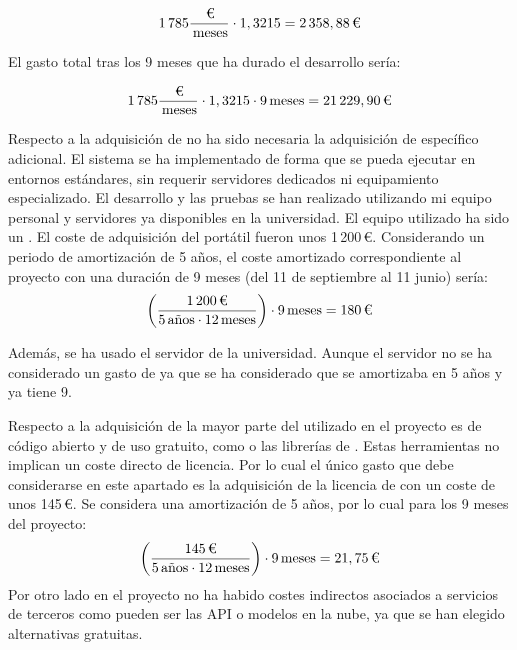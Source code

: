 $$
1\,785\frac{\,\text{\texteuro}}{\,\text{meses}} \cdot 1,3215
= 2\,358,88\,\text{\texteuro}
$$

El gasto total tras los 9 meses que ha durado el desarrollo sería:

$$
1\,785\frac{\,\text{\texteuro}}{\,\text{meses}} \cdot 1,3215 \cdot 9\,\text{meses}
= 21\,229,90\,\text{\texteuro}
$$


Respecto a la adquisición de  no ha sido necesaria la adquisición de  específico adicional. El sistema  se ha implementado de forma que se pueda ejecutar en entornos estándares, sin requerir servidores dedicados ni equipamiento especializado. El desarrollo y las pruebas se han realizado utilizando mi equipo personal y servidores ya disponibles en la universidad. El equipo utilizado ha sido un . El coste de adquisición del portátil fueron unos 1\,200\,€. Considerando un periodo de amortización de 5 años, el coste amortizado correspondiente al proyecto con una duración de 9 meses (del 11 de septiembre al 11 junio) sería:
$$
\left(\frac{1\,200\,\text{\texteuro}}{5\,\text{años} \cdot 12\,\text{meses}}\right)\cdot 9\,\text{meses}
= 180\,\text{\texteuro}
$$

Además, se ha usado el servidor  de la universidad. Aunque el servidor no se ha considerado un gasto de  ya que se ha considerado que se amortizaba en 5 años y ya tiene 9.

Respecto a la adquisición de  la mayor parte del  utilizado en el proyecto es de código abierto y de uso gratuito, como  o las librerías de . Estas herramientas no implican un coste directo de licencia. Por lo cual el único gasto que debe considerarse en este apartado es la adquisición de la licencia de 
 con un coste de unos 145\,€. Se considera una amortización de 5 años, por lo cual para los 9 meses del proyecto:
$$
\left(\frac{145\,\text{\texteuro}}{5\,\text{años} \cdot 12\,\text{meses}}\right)\cdot 9\,\text{meses}
= 21,75\,\text{\texteuro}
$$
Por otro lado en el proyecto no ha habido costes indirectos asociados a servicios de terceros como pueden ser las API o modelos en la nube, ya que se han elegido alternativas gratuitas.

